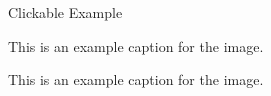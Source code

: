 \documentclass[11pt,a4paper]{article}
\begin{document}
\begin{figure}[h]
\caption{Clickable Example}
\end{figure}

\begin{figure}[h]
\caption{This is an example caption for the image.}
\end{figure}

\begin{figure}[h]
\caption{This is an example caption for the image.}
\end{figure}
\end{document}
